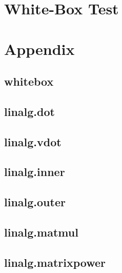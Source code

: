 \documentclass[a4paper,11pt]{article}
\begin{document}
\section{White-Box Test}



\section{Appendix}

\subsection{whitebox}




\subsection{linalg.dot}


\subsection{linalg.vdot}


\subsection{linalg.inner}


\subsection{linalg.outer}


\subsection{linalg.matmul}


\subsection{linalg.matrixpower}

\end{document}
